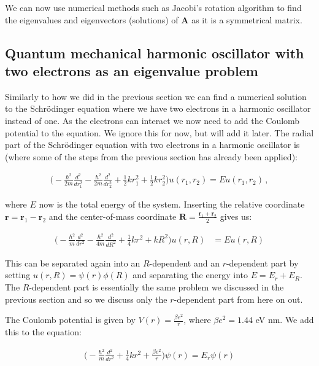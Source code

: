 \documentclass[reprint,english,notitlepage]{revtex4-1}  %
\begin{document}
We can now use numerical methods such as Jacobi's rotation algorithm to find the eigenvalues and eigenvectors (solutions) of \textbf{A} as it is a symmetrical matrix.


\subsection{Quantum mechanical harmonic oscillator with two electrons as an eigenvalue problem} \label{sec:II:e}

Similarly to how we did in the previous section we can find a numerical solution to the Schrödinger equation where we have two electrons in a harmonic oscillator instead of one. As the electrons can interact we now need to add the Coulomb potential to the equation. We ignore this for now, but will add it later. The radial part of the Schrödinger equation with two electrons in a harmonic oscillator is (where some of the steps from the previous section has already been applied):

\begin{align*}
\bigg( -\frac{\hbar^2}{2m} \frac{d^2}{dr_1^2} - \frac{\hbar^2}{2m} \frac{d^2}{dr_2^2} + \frac{1}{2}kr_1^2 + \frac{1}{2}kr_2^2 \bigg) u(r_1,r_2) =  Eu(r_1,r_2) \, ,
\end{align*}

where $E$ now is the total energy of the system. Inserting the relative coordinate $\textbf{r} = \textbf{r}_1 - \textbf{r}_2$ and the center-of-mass coordinate $\textbf{R} = \frac{\textbf{r}_1 + \textbf{r}_2}{2}$ gives us:

\begin{align*}
\bigg( -\frac{\hbar^2}{m} \frac{d^2}{dr^2} - \frac{\hbar^2}{4m} \frac{d^2}{dR^2} + \frac{1}{4}kr^2 + kR^2\bigg) u(r,R) &= Eu(r,R)
\end{align*}

This can be separated again into an $R$-dependent and an $r$-dependent part by setting $u(r,R) = \psi(r) \phi(R)$ and separating the energy into $E = E_r + E_R$. The $R$-dependent part is essentially the same problem we discussed in the previous section and so we discuss only the $r$-dependent part from here on out.

The Coulomb potential is given by $V(r) = \frac{\beta e^2}{r}$, where $\beta e^2 = 1.44$ eV nm. We add this to the equation:

\begin{align*}
\bigg( - \frac{\hbar^2}{m} \frac{d^2}{dr^2} + \frac{1}{4}kr^2 + \frac{\beta e^2}{r} \bigg) \psi(r) = E_r \psi(r)
\end{align*}
\end{document}
